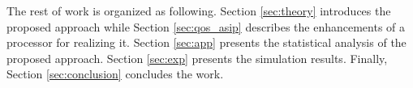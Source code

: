 The rest of work is organized as following. Section \ref{sec:theory} introduces the proposed approach while Section \ref{sec:qos_asip} describes the enhancements of a processor for realizing it. Section \ref{sec:app} presents the statistical analysis of the proposed approach. Section \ref{sec:exp} presents the simulation results. Finally, Section \ref{sec:conclusion} concludes the work.
  


